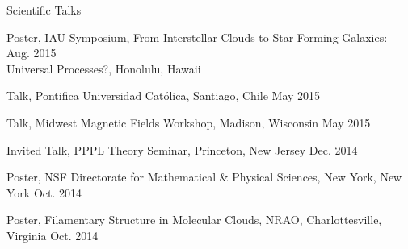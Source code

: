 \documentclass{resume_clark} %
\newcommand{\hi}{H{\sc i}~}
\begin{document}
\begin{rSection}{Scientific Talks}
\begin{etaremune}[itemsep=-1.8mm]
\item Poster, IAU Symposium, From Interstellar Clouds to Star-Forming Galaxies: \hfill {Aug. 2015}\\Universal Processes?, Honolulu, Hawaii

\item Talk, Pontifica Universidad Cat\'olica, Santiago, Chile \hfill {May 2015}

\item Talk, Midwest Magnetic Fields Workshop, Madison, Wisconsin \hfill {May 2015}

\item Invited Talk, PPPL Theory Seminar, Princeton, New Jersey \hfill {Dec. 2014}

\item Poster, NSF Directorate for Mathematical \& Physical Sciences, New York, New York \hfill {Oct. 2014}

\item Poster, Filamentary Structure in Molecular Clouds, NRAO, Charlottesville, Virginia \hfill {Oct. 2014}


\end{etaremune}
\end{rSection}
\end{document}
